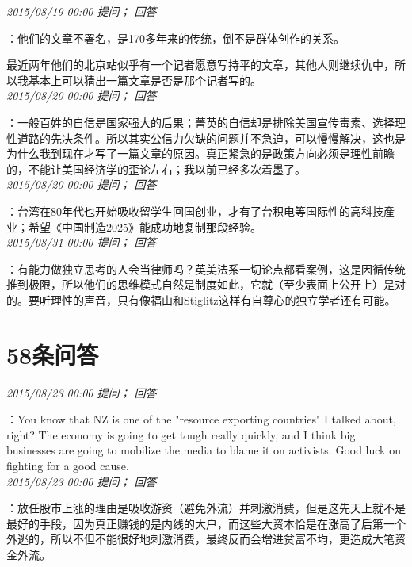 \documentclass[twocolumn]{ctexart}
\begin{document}
\textit{\hfill\noindent\small 2015/08/19 00:00 提问； 回答}

：他们的文章不署名，是170多年来的传统，倒不是群体创作的关系。

最近两年他们的北京站似乎有一个记者愿意写持平的文章，其他人则继续仇中，所以我基本上可以猜出一篇文章是否是那个记者写的。\\

\textit{\hfill\noindent\small 2015/08/20 00:00 提问； 回答}

：一般百姓的自信是国家强大的后果；菁英的自信却是排除美国宣传毒素、选择理性道路的先决条件。所以其实公信力欠缺的问题并不急迫，可以慢慢解决，这也是为什么我到现在才写了一篇文章的原因。真正紧急的是政策方向必须是理性前瞻的，不能让美国经济学的歪论左右；我以前已经多次着墨了。\\

\textit{\hfill\noindent\small 2015/08/20 00:00 提问； 回答}

：台湾在80年代也开始吸收留学生回国创业，才有了台积电等国际性的高科技產业；希望《中国制造2025》能成功地复制那段经验。\\

\textit{\hfill\noindent\small 2015/08/31 00:00 提问； 回答}

：有能力做独立思考的人会当律师吗？英美法系一切论点都看案例，这是因循传统推到极限，所以他们的思维模式自然是制度如此，它就（至少表面上公开上）是对的。要听理性的声音，只有像福山和Stiglitz这样有自尊心的独立学者还有可能。\\

\section{58条问答}

\textit{\hfill\noindent\small 2015/08/23 00:00 提问； 回答}

：You know that  NZ is one of the "resource exporting countries" I talked about, right? The economy is going to get tough really quickly, and I think big businesses are going to mobilize the media to blame it on activists. Good luck on fighting for a good cause.\\

\textit{\hfill\noindent\small 2015/08/23 00:00 提问； 回答}

：放任股市上涨的理由是吸收游资（避免外流）并刺激消费，但是这先天上就不是最好的手段，因为真正赚钱的是内线的大户，而这些大资本恰是在涨高了后第一个外逃的，所以不但不能很好地刺激消费，最终反而会增进贫富不均，更造成大笔资金外流。
\end{document}
